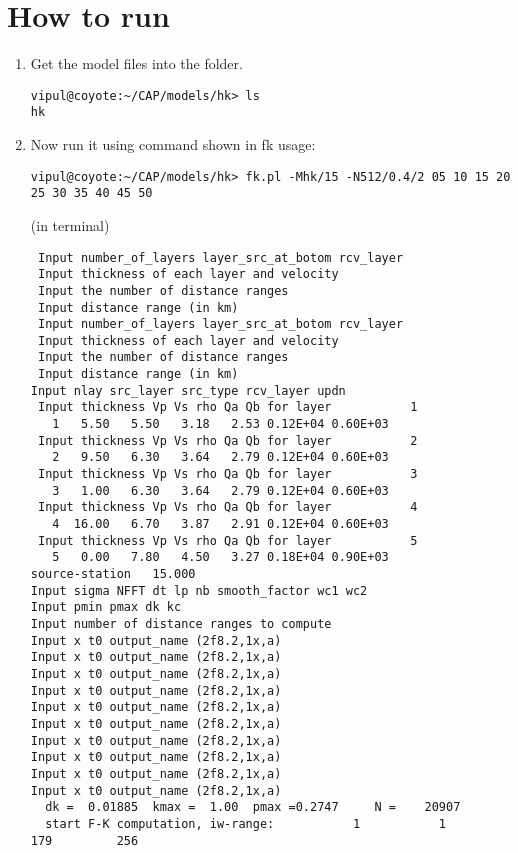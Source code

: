 \documentclass[11pt,titlepage,fleqn]{article}
\newcommand{\tab}{\hspace*{2em}}
\newcommand{\gt}{\textgreater}
\begin{document}

\section{How to run}

\begin{enumerate}
\item
Get the model files into the folder.\\
\tab {\bf CAP \gt~ models \gt~ hk}
\begin{verbatim}
vipul@coyote:~/CAP/models/hk> ls
hk
\end{verbatim}

\item
 Now run it using command shown in fk usage:
\begin{verbatim}
vipul@coyote:~/CAP/models/hk> fk.pl -Mhk/15 -N512/0.4/2 05 10 15 20 25 30 35 40 45 50
\end{verbatim}
\tab {\bf OUTPUT:} (in terminal)
\begin{verbatim}
 Input number_of_layers layer_src_at_botom rcv_layer
 Input thickness of each layer and velocity
 Input the number of distance ranges
 Input distance range (in km)
 Input number_of_layers layer_src_at_botom rcv_layer
 Input thickness of each layer and velocity
 Input the number of distance ranges
 Input distance range (in km)
Input nlay src_layer src_type rcv_layer updn
 Input thickness Vp Vs rho Qa Qb for layer           1
   1   5.50   5.50   3.18   2.53 0.12E+04 0.60E+03
 Input thickness Vp Vs rho Qa Qb for layer           2
   2   9.50   6.30   3.64   2.79 0.12E+04 0.60E+03
 Input thickness Vp Vs rho Qa Qb for layer           3
   3   1.00   6.30   3.64   2.79 0.12E+04 0.60E+03
 Input thickness Vp Vs rho Qa Qb for layer           4
   4  16.00   6.70   3.87   2.91 0.12E+04 0.60E+03
 Input thickness Vp Vs rho Qa Qb for layer           5
   5   0.00   7.80   4.50   3.27 0.18E+04 0.90E+03
source-station   15.000
Input sigma NFFT dt lp nb smooth_factor wc1 wc2
Input pmin pmax dk kc
Input number of distance ranges to compute
Input x t0 output_name (2f8.2,1x,a)
Input x t0 output_name (2f8.2,1x,a)
Input x t0 output_name (2f8.2,1x,a)
Input x t0 output_name (2f8.2,1x,a)
Input x t0 output_name (2f8.2,1x,a)
Input x t0 output_name (2f8.2,1x,a)
Input x t0 output_name (2f8.2,1x,a)
Input x t0 output_name (2f8.2,1x,a)
Input x t0 output_name (2f8.2,1x,a)
Input x t0 output_name (2f8.2,1x,a)
  dk =  0.01885  kmax =  1.00  pmax =0.2747     N =    20907
  start F-K computation, iw-range:           1           1         179         256

\end{verbatim}
\end{enumerate}
\end{document}
